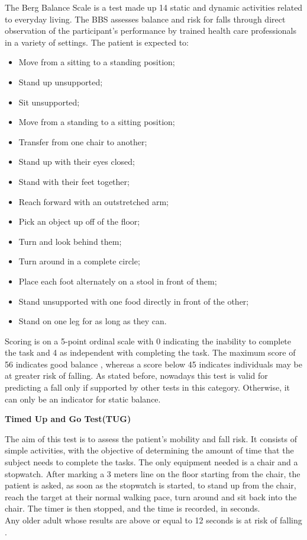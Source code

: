 The Berg Balance Scale is a test made up 14 static and dynamic activities related to everyday living. The BBS assesses balance and risk for falls through direct observation of the participant's performance by trained health care professionals in a variety of settings. The patient is expected to:
\begin{itemize}
\itemsep0cm 
    \item Move from a sitting to a standing position;
    \item Stand up unsupported;
    \item Sit unsupported;
    \item Move from a standing to a sitting position;
    \item Transfer from one chair to another;
    \item Stand up with their eyes closed;
    \item Stand with their feet together;
    \item Reach forward with an outstretched arm;
    \item Pick an object up off of the floor;
    \item Turn and look behind them;
    \item Turn around in a complete circle;
    \item Place each foot alternately on a stool in front of them;
    \item Stand unsupported with one food directly in front of the other;
    \item Stand on one leg for as long as they can.
\end{itemize}
Scoring is on a 5-point ordinal scale with 0 indicating the inability to complete the task and 4 as independent with 
completing the task. The maximum score of 56 indicates good balance \cite{BergBalanceScale}, 
whereas a score below 45 indicates individuals may be at greater risk of falling. As stated before, 
nowadays this test is valid for predicting a fall only if supported by other tests in this category. 
Otherwise, it can only be an indicator for static balance. 

\vspace{0.3cm}
\textbf{Timed Up and Go Test(TUG)}

The aim of this test is to assess the patient's mobility and fall risk.
It consists of simple activities, with the objective of determining the amount of time that the subject needs to complete the tasks. 
The only equipment needed is a chair and a stopwatch.
After marking a 3 meters line on the floor starting from the chair, the patient is asked, as soon as the stopwatch is started, 
to stand up from the chair, reach the target at their normal walking pace, turn around and sit back into the chair.
The timer is then stopped, and the time is recorded, in seconds. 
\\Any older adult whose results are above or equal to 12 seconds is at risk of falling \cite{TUG}.

